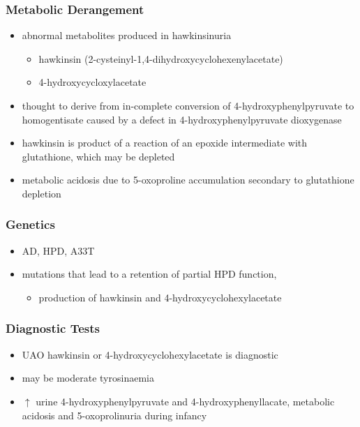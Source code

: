 \documentclass{scrartcl}
\begin{document}
\subsubsection{Metabolic Derangement}
\label{sec:org9410acb}
\begin{itemize}
\item abnormal metabolites produced in hawkinsinuria
\begin{itemize}
\item hawkinsin (2-cysteinyl-1,4-dihydroxycyclohexenylacetate)
\item 4-hydroxycycloxylacetate
\end{itemize}
\item thought to derive from in-complete conversion of
4-hydroxyphenylpyruvate to homogentisate caused by a defect in
4-hydroxyphenylpyruvate dioxygenase
\end{itemize}
\begin{itemize}
\item hawkinsin is product of a reaction of an epoxide intermediate with
glutathione, which may be depleted
\item metabolic acidosis due to 5-oxoproline accumulation secondary to
glutathione depletion
\end{itemize}

\subsubsection{Genetics}
\label{sec:org283f5b9}
\begin{itemize}
\item AD, HPD, A33T
\item mutations that lead to a retention of partial HPD function,
\begin{itemize}
\item production of hawkinsin and 4-hydroxycyclohexylacetate
\end{itemize}
\end{itemize}
\subsubsection{Diagnostic Tests}
\label{sec:org03190a8}
\begin{itemize}
\item UAO hawkinsin or 4-hydroxycyclohexylacetate is diagnostic
\item may be moderate tyrosinaemia
\item \(\uparrow\) urine 4-hydroxyphenylpyruvate and 4-hydroxyphenyllacate,
metabolic acidosis and 5-oxoprolinuria during infancy
\end{itemize}
\end{document}
